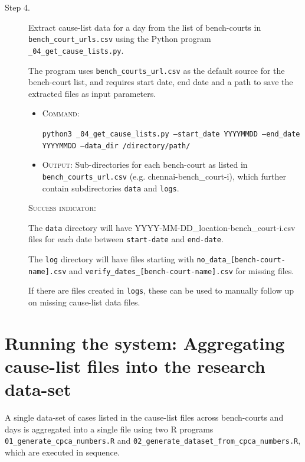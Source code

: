 \documentclass[12pt,a4paper]{article}
\begin{document}
\begin{description}
\item[Step 4.] Extract cause-list data for a day from the list of
  bench-courts in \texttt{bench\_court\_urls.csv} using the Python
  program \texttt{\_04\_get\_cause\_lists.py}.

  The program uses \texttt{bench\_courts\_url.csv} as the default
  source for the bench-court list, and requires start date, end date
  and a path to save the extracted files as input parameters.

  \begin{itemize}
  \item \textsc{Command}:
  
    \texttt{python3 \_04\_get\_cause\_lists.py --start\_date YYYYMMDD
      --end\_date YYYYMMDD --data\_dir /directory/path/}
  
  \item \textsc{Output}: Sub-directories for each bench-court as
    listed in \texttt{bench\_courts\_url.csv}
    (e.g. chennai-bench\_court-i), which further contain
    subdirectories \texttt{data} and \texttt{logs}.
  \end{itemize}

  \textsc{Success indicator:}

  The \texttt{data} directory will have
  YYYY-MM-DD\_location-bench\_court-i.csv files for each date between
  \texttt{start-date} and \texttt{end-date}.

  The \texttt{log} directory will have files starting with
  \texttt{no\_data\_[bench-court-name].csv} and
  \texttt{verify\_dates\_[bench-court-name].csv} for missing files.

  If there are files created in \texttt{logs}, these can be used to
  manually follow up on missing cause-list data files.

\end{description}


\section{Running the system: Aggregating cause-list files into the research data-set}

A single data-set of cases listed in the cause-list files across
bench-courts and days is aggregated into a single file using two R
programs \texttt{01\_generate\_cpca\_numbers.R} and
\texttt{02\_generate\_dataset\_from\_cpca\_numbers.R}, which are
executed in sequence.
\end{document}
